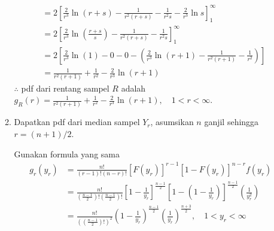 \documentclass{exam}
\begin{document}
\begin{enumerate}
\begin{enumerate}
\begin{solution}
\begin{align*}
                    &= 2\left[\frac{2}{r^3}\ln(r+s)-\frac{1}{r^2(r+s)}-\frac{1}{r^2s}-\frac{2}{r^3}\ln s\right]_{1}^{\infty}\\
                    &= 2\left[\frac{2}{r^3}\ln\left(\frac{r+s}{s}\right)-\frac{1}{r^2(r+s)}-\frac{1}{r^2s}\right]_{1}^{\infty}\\
                    &= 2\left[\frac{2}{r^3}\ln\left(1\right)-0-0-\left(\frac{2}{r^3}\ln(r+1)-\frac{1}{r^2(r+1)}-\frac{1}{r^2}\right)\right]\\
                    &= \frac{1}{r^2(r+1)}+\frac{1}{r^2}-\frac{2}{r^3}\ln(r+1)
                \end{align*}
                $\therefore$ pdf dari rentang sampel $R$ adalah $\displaystyle g_R(r)=\frac{1}{r^2(r+1)}+\frac{1}{r^2}-\frac{2}{r^3}\ln(r+1), \quad 1<r<\infty$.
            \end{solution}
            \item Dapatkan pdf dari median sampel $Y_r$, asumsikan $n$ ganjil sehingga $r=(n+1)/2$.
            \begin{solution}
                Gunakan formula yang sama
                \begin{align*}
                    g_r(y_r) &= \frac{n!}{(r-1)!(n-r)!}[F(y_r)]^{r-1}[1-F(y_r)]^{n-r}f(y_r)\\
                    &= \frac{n!}{\left(\frac{n-1}{2}\right)!\left(\frac{n-1}{2}\right)!}\left[1-\frac{1}{y_r}\right]^{\frac{n-1}{2}}\left[1-\left(1-\frac{1}{y_r}\right)\right]^{\frac{n-1}{2}}\left(\frac{1}{y_r^2}\right)\\
                    &= \frac{n!}{\left(\left(\frac{n-1}{2}\right)!\right)^2}\left(1-\frac{1}{y_r}\right)^{\frac{n-1}{2}}\left(\frac{1}{y_r}\right)^\frac{n+3}{2},\quad 1<y_r<\infty
                \end{align*}
            \end{solution}
        \end{enumerate}


\end{enumerate}
\end{document}

